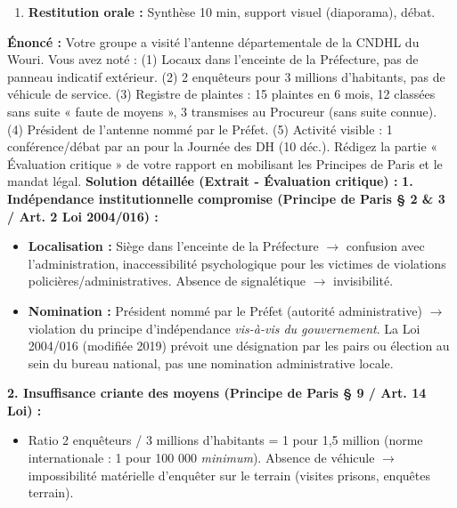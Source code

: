 \documentclass[11pt]{article}
\begin{document}
\begin{methode}
\begin{enumerate}
\begin{itemize}
                \item \textbf{Critères d'évaluation (Grille d'analyse) :} Conformité Principes de Paris (CNDHL), Indépendance, Accessibilité, Effectivité (traitement plaintes), Visibilité, Durabilité.
            \end{itemize}
        \item \textbf{Restitution orale :} Synthèse 10 min, support visuel (diaporama), débat.
    \end{enumerate}
\end{methode}

\begin{exoresolu}
    \textbf{Énoncé :} Votre groupe a visité l'antenne départementale de la CNDHL du Wouri. Vous avez noté : (1) Locaux dans l'enceinte de la Préfecture, pas de panneau indicatif extérieur. (2) 2 enquêteurs pour 3 millions d'habitants, pas de véhicule de service. (3) Registre de plaintes : 15 plaintes en 6 mois, 12 classées sans suite « faute de moyens », 3 transmises au Procureur (sans suite connue). (4) Président de l'antenne nommé par le Préfet. (5) Activité visible : 1 conférence/débat par an pour la Journée des DH (10 déc.). Rédigez la partie « Évaluation critique » de votre rapport en mobilisant les Principes de Paris et le mandat légal.
    \tcblower
    \textbf{Solution détaillée (Extrait - Évaluation critique) :}
    \textbf{1. Indépendance institutionnelle compromise (Principe de Paris § 2 \& 3 / Art. 2 Loi 2004/016) :}
    \begin{itemize}
        \item \textbf{Localisation :} Siège dans l'enceinte de la Préfecture $\rightarrow$ confusion avec l'administration, inaccessibilité psychologique pour les victimes de violations policières/administratives. Absence de signalétique $\rightarrow$ invisibilité.
        \item \textbf{Nomination :} Président nommé par le Préfet (autorité administrative) $\rightarrow$ violation du principe d'indépendance \emph{vis-à-vis du gouvernement}. La Loi 2004/016 (modifiée 2019) prévoit une désignation par les pairs ou élection au sein du bureau national, pas une nomination administrative locale.
    \end{itemize}
    \textbf{2. Insuffisance criante des moyens (Principe de Paris § 9 / Art. 14 Loi) :}
    \begin{itemize}
        \item Ratio 2 enquêteurs / 3 millions d'habitants = 1 pour 1,5 million (norme internationale : 1 pour 100 000 \emph{minimum}). Absence de véhicule $\rightarrow$ impossibilité matérielle d'enquêter sur le terrain (visites prisons, enquêtes terrain).

\end{itemize}
\end{exoresolu}
\end{document}
